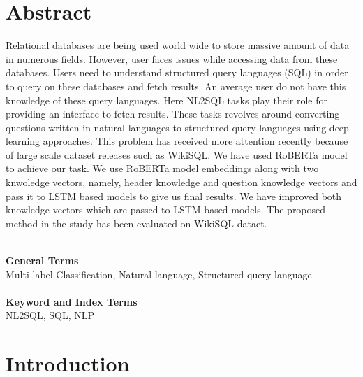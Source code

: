 \documentclass[12pt]{article}
\begin{document}
\section{Abstract}
Relational databases are being used world wide to store massive amount of data in numerous fields. However, user faces issues while accessing data from these databases. Users need to understand structured query languages (SQL) in order to query on these databases and fetch results. An average user do not have this knowledge of these query languages. Here NL2SQL tasks play their role for providing an interface to fetch results. These tasks revolves around converting questions written in natural languages to structured query languages using deep learning approaches. This problem has received more attention recently because of large scale dataset releases such as WikiSQL. We have used RoBERTa model to achieve our task. We use RoBERTa model embeddings along with two knwoledge vectors, namely, header knowledge and question knowledge vectors and pass it to LSTM based models to give us final results. We have improved both knowledge vectors which are passed to LSTM based models. The proposed method in the study has been evaluated on WikiSQL dataet. 
\\
\\

\begin{flushleft}
\textbf{General Terms}
\\
Multi-label Classification, Natural language, Structured query language
\\
~\\
\textbf{Keyword and Index Terms}
\\
NL2SQL, SQL, NLP
\end{flushleft}



\newpage

\section{Introduction}
\end{document}
